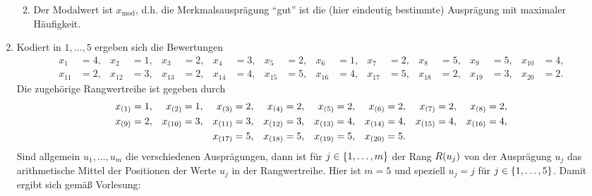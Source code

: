 \documentclass{exercise}
\begin{document}
\begin{enumerate}
\begin{enumerate}
\begin{center}
            \end{center}
            \item Der Modalwert ist \(x_\text{mod}\), d.h. die Merkmalsausprägung ``gut'' ist die (hier eindeutig bestimmte) Ausprägung mit maximaler Häufigkeit.
        \end{enumerate}
        \item Kodiert in \(1, \ldots, 5\) ergeben sich die Bewertungen
        \begin{align*}
            x_1 &= 4, & x_2 &= 1, & x_3 &= 2, & x_4 &= 3, & x_5 &= 2, & x_6 &= 1, & x_7 &= 2, & x_8 &= 5, & x_9 &= 5, & x_{10} &= 4,\\
            x_{11} &= 2, & x_{12} &= 3, & x_{13} &= 2, & x_{14} &= 4, & x_{15} &= 5, & x_{16} &= 4, & x_{17} &= 5, & x_{18} &= 2, & x_{19} &= 3, & x_{20} &= 2.
        \end{align*}
        Die zugehörige Rangwertreihe ist gegeben durch
        \begin{align*}
            x_{\parentheses*{1}} &= 1, & x_{\parentheses*{2}} &= 1, & x_{\parentheses*{3}} &= 2, & x_{\parentheses*{4}} &= 2, & x_{\parentheses*{5}} &= 2, & x_{\parentheses*{6}} &= 2, & x_{\parentheses*{7}} &= 2, & x_{\parentheses*{8}} &= 2,\\ 
            x_{\parentheses*{9}} &= 2, & x_{\parentheses*{10}} &= 3, & x_{\parentheses*{11}} &= 3, & x_{\parentheses*{12}} &= 3, & x_{\parentheses*{13}} &= 4, & x_{\parentheses*{14}} &= 4, & x_{\parentheses*{15}} &= 4, & x_{\parentheses*{16}} &= 4,\\
            &&&& x_{\parentheses*{17}} &= 5, & x_{\parentheses*{18}} &= 5, & x_{\parentheses*{19}} &= 5, & x_{\parentheses*{20}} &= 5.
        \end{align*}
        Sind allgemein \(u_1, \ldots, u_m\) die verschiedenen Ausprägungen, dann ist für \(j \in \braces*{1, \ldots, m}\) der Rang \(R\parentheses*{u_j}\) von der Ausprägung \(u_j\) das arithmetische Mittel der Positionen der Werte \(u_j\) in der Rangwertreihe.
        Hier ist \(m = 5\) und speziell \(u_j = j\) für \(j \in \braces*{1, \ldots, 5}\).
        Damit ergibt sich gemäß Vorlesung:
        \begin{center}
            \begin{tabular}{lccccc}
                \toprule

\end{tabular}
\end{center}
\end{enumerate}
\end{document}
